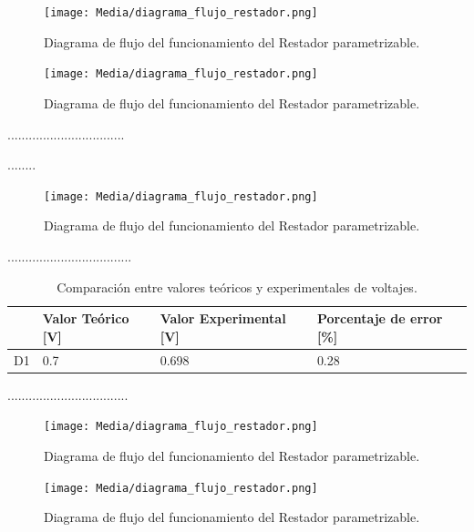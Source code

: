 \documentclass[journal]{IEEEtran}
\begin{document}
\begin{figure}[H]
    \centering
    \texttt{[image: Media/diagrama\_flujo\_restador.png]}
    \caption{Diagrama de flujo del funcionamiento del Restador parametrizable.}
    \label{fig:diagrama_flujo_restador}
\end{figure}
\begin{figure}[H]
    \centering
    \texttt{[image: Media/diagrama\_flujo\_restador.png]}
    \caption{Diagrama de flujo del funcionamiento del Restador parametrizable.}
    \label{fig:diagrama_flujo_restador}
\end{figure}
\par .................................
\par ........
\begin{figure}[H]
    \centering
    \texttt{[image: Media/diagrama\_flujo\_restador.png]}
    \caption{Diagrama de flujo del funcionamiento del Restador parametrizable.}
    \label{fig:diagrama_flujo_restador}
\end{figure}
\par ...................................
\begin{table}[h]
\caption{Comparación entre valores teóricos y experimentales de voltajes.}
    \centering
    \renewcommand{\arraystretch}{1.2} %
    \begin{tabular}{|l|p{2cm}|p{2cm}|p{2cm}|}
        \hline
        & \textbf{Valor Teórico [V]} & \textbf{Valor Experimental [V]} & \textbf{Porcentaje de error [\%]} \\
        \hline
        D1 & 0.7  & 0.698  & 0.28 \\
        \hline
    \end{tabular}
    \label{tab:voltajes}
\end{table}

\par ..................................
\begin{figure}[H]
    \centering
    \texttt{[image: Media/diagrama\_flujo\_restador.png]}
    \caption{Diagrama de flujo del funcionamiento del Restador parametrizable.}
    \label{fig:diagrama_flujo_restador}
\end{figure}
\begin{figure}[H]
    \centering
    \texttt{[image: Media/diagrama\_flujo\_restador.png]}
    \caption{Diagrama de flujo del funcionamiento del Restador parametrizable.}
    \label{fig:diagrama_flujo_restador}
\end{figure}
\end{document}
